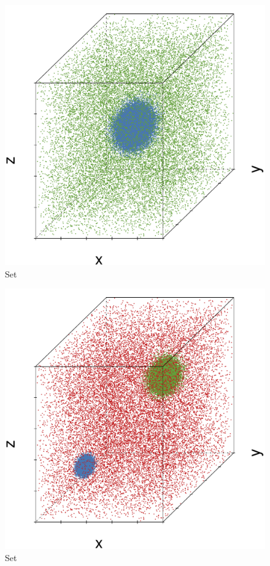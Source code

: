 \begin{subfigure}{0.23\textwidth}
	\centering
	\includegraphics[width=\textwidth]{3/img/datasetplot_ferdosi_1_60000.pdf}
	\caption{Set \ferdosiOne}
	\label{fig:3:simulated:datasets:ferdosi1}
\end{subfigure}
\begin{subfigure}{0.23\textwidth}
	\centering
	\includegraphics[width=\textwidth]{3/img/datasetplot_ferdosi_2_60000.pdf}
	\caption{Set \ferdosiTwo}
	\label{fig:3:simulated:datasets:ferdosi2}
\end{subfigure}	
